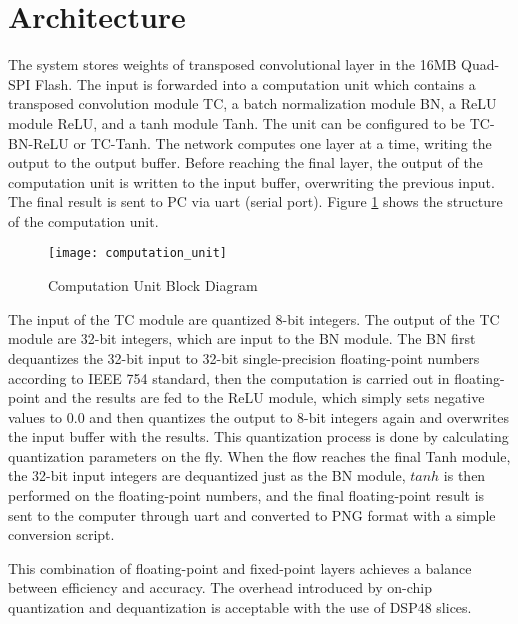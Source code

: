 \section{Architecture}

The system stores weights of transposed convolutional layer in the 16MB Quad-SPI Flash. The input is
forwarded into a computation unit which contains a transposed convolution module TC,
a batch normalization module BN, a ReLU module ReLU, and a tanh module Tanh.
The unit can be configured to be TC-BN-ReLU or TC-Tanh. The network computes one
layer at a time, writing the output to the output buffer. Before reaching the final layer, the output of
the computation unit is written to the input buffer, overwriting the previous input. The final result is
sent to PC via \gls{uart} (serial port). Figure \ref{fig:computation_unit} shows the structure of the
computation unit.

\begin{figure}[h]
  \centering
  \texttt{[image: computation\_unit]}
  \caption{Computation Unit Block Diagram}
  \label{fig:computation_unit}
\end{figure}

The input of the TC module are quantized 8-bit integers. The output of the TC module are 32-bit
integers, which are input to the BN module. The BN first dequantizes the 32-bit input to 32-bit
single-precision floating-point numbers according to IEEE 754 standard, then the computation is carried
out in floating-point and the results are fed to the ReLU module, which simply sets negative values to
$0.0$ and then quantizes the output to 8-bit integers again and overwrites the input buffer with the
results. This quantization process is done by calculating quantization parameters on the fly.
When the flow reaches the final Tanh module, the 32-bit input integers are dequantized just as the
BN module, $tanh$ is then performed on the floating-point numbers, and the final floating-point result is
sent to the computer through \gls{uart} and converted to PNG format with a simple conversion script.

This combination of floating-point and fixed-point layers achieves a balance between efficiency and
accuracy. The overhead introduced by on-chip quantization and dequantization is acceptable with the
use of DSP48 slices.

\clearpage %
